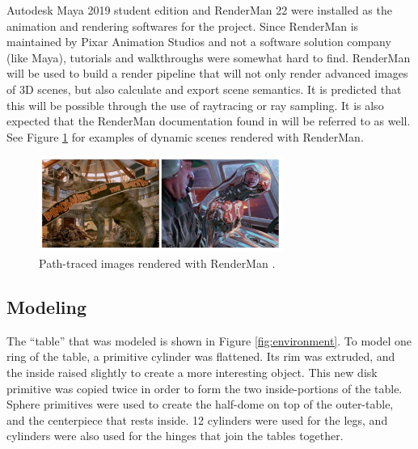 \documentclass[conference]{IEEEtran}
\begin{document}
Autodesk Maya 2019 student edition
and RenderMan 22 were
installed as the animation and rendering softwares for the project.
Since RenderMan is maintained by Pixar Animation Studios and not a software solution company
(like Maya),
tutorials and walkthroughs were somewhat hard to find.
RenderMan will be used to build a render pipeline that will not only render advanced images
of 3D scenes, but also calculate and export scene semantics.
It is predicted that this will be possible through the use of raytracing or ray sampling.
It is also expected that the RenderMan documentation found in \cite{renderman_docs}
will be referred to as well.
See Figure \ref{fig:renderman} for examples of dynamic scenes rendered with RenderMan.

\begin{figure}[htbp]
\centerline{\includegraphics[width=8cm]{renderman.png}}
\caption{Path-traced images rendered with RenderMan \cite{renderman}.}
\label{fig:renderman}
\end{figure}

\subsection{Modeling}
The ``table'' that was modeled is shown in Figure \ref{fig:environment}.
To model one ring of the table, a primitive cylinder was flattened.
Its rim was extruded, and the inside raised slightly to create a more interesting object.
This new disk primitive was copied twice in order to form the two inside-portions of the table.
Sphere primitives were used to create the half-dome on top of the outer-table, and the centerpiece
that rests inside. 12 cylinders were used for the legs, and cylinders were also used
for the hinges that join the tables together.
\end{document}
